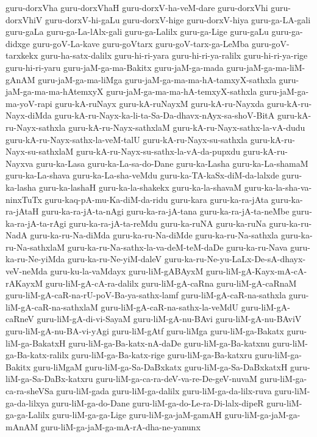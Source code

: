 {guru-dorxVha
guru-dorxVhaH
guru-dorxV-ha-veM-dare
guru-dorxVhi
guru-dorxVhiV
guru-dorxV-hi-gaLu
guru-dorxV-hige
guru-dorxV-hiya
guru-ga-LA-gali
guru-gaLa
guru-ga-La-lAlx-gali
guru-ga-Lalilx
guru-ga-Lige
guru-gaLu
guru-ga-didxge
guru-goV-La-kave
guru-goVtarx
guru-goV-tarx-ga-LeMba
guru-goV-tarxkekx
guru-ha-satx-dalilx
guru-hi-ri-yara
guru-hi-ri-ya-ralilx
guru-hi-ri-ya-rige
guru-hi-ri-yaru
guru-jaM-ga-ma-Bakitx
guru-jaM-ga-mada
guru-jaM-ga-ma-liM-gAnAM
guru-jaM-ga-ma-liMga
guru-jaM-ga-ma-ma-hA-tamxyX-sathxla
guru-jaM-ga-ma-ma-hAtemxyX
guru-jaM-ga-ma-ma-hA-temxyX-sathxla
guru-jaM-ga-ma-yoV-rapi
guru-kA-ruNayx
guru-kA-ruNayxM
guru-kA-ru-Nayxda
guru-kA-ru-Nayx-diMda
guru-kA-ru-Nayx-ka-li-ta-Sa-Da-dhavx-nAyx-sa-shoV-BitA
guru-kA-ru-Nayx-sathxla
guru-kA-ru-Nayx-sathxlaM
guru-kA-ru-Nayx-sathx-la-vA-dudu
guru-kA-ru-Nayx-sathx-la-veM-talU
guru-kA-ru-Nayx-su-sathxla
guru-kA-ru-Nayx-su-sathxlaM
guru-kA-ru-Nayx-su-sathx-la-vA-da-pupxdu
guru-kA-ru-Nayxva
guru-ka-Lasa
guru-ka-La-sa-do-Dane
guru-ka-Lasha
guru-ka-La-shamaM
guru-ka-La-shava
guru-ka-La-sha-veMdu
guru-ka-TA-kaSx-diM-da-lalxde
guru-ka-lasha
guru-ka-lashaH
guru-ka-la-shakekx
guru-ka-la-shavaM
guru-ka-la-sha-va-ninxTuTx
guru-kaq-pA-mu-Ka-diM-da-ridu
guru-kara
guru-ka-ra-jAta
guru-ka-ra-jAtaH
guru-ka-ra-jA-ta-nAgi
guru-ka-ra-jA-tana
guru-ka-ra-jA-ta-neMbe
guru-ka-ra-jA-ta-rAgi
guru-ka-ra-jA-ta-reMdu
guru-ka-ruNA
guru-ka-ruNa
guru-ka-ru-NadA
guru-ka-ru-Na-diMda
guru-ka-ru-Na-diMde
guru-ka-ru-Na-sathxla
guru-ka-ru-Na-sathxlaM
guru-ka-ru-Na-sathx-la-va-deM-teM-daDe
guru-ka-ru-Nava
guru-ka-ru-Ne-yiMda
guru-ka-ru-Ne-yiM-daleV
guru-ka-ru-Ne-yu-LaLx-De-sA-dhayx-veV-neMda
guru-ku-la-vaMdayx
guru-liM-gABAyxM
guru-liM-gA-Kayx-mA-cA-rAKayxM
guru-liM-gA-cA-ra-dalilx
guru-liM-gA-caRna
guru-liM-gA-caRnaM
guru-liM-gA-caR-na-rU-poV-Ba-ya-sathx-lamf
guru-liM-gA-caR-na-sathxla
guru-liM-gA-caR-na-sathxlaM
guru-liM-gA-caR-na-sathx-la-veMdU
guru-liM-gA-caRneV
guru-liM-gA-di-vi-SayaM
guru-liM-gA-nu-BAvi
guru-liM-gA-nu-BAviV
guru-liM-gA-nu-BA-vi-yAgi
guru-liM-gAtf
guru-liMga
guru-liM-ga-Bakatx
guru-liM-ga-BakatxH
guru-liM-ga-Ba-katx-nA-daDe
guru-liM-ga-Ba-katxnu
guru-liM-ga-Ba-katx-ralilx
guru-liM-ga-Ba-katx-rige
guru-liM-ga-Ba-katxru
guru-liM-ga-Bakitx
guru-liMgaM
guru-liM-ga-Sa-DaBxkatx
guru-liM-ga-Sa-DaBxkatxH
guru-liM-ga-Sa-DaBx-katxru
guru-liM-ga-ca-ra-deV-va-re-De-geV-nuvaM
guru-liM-ga-ca-ra-sheVSa
guru-liM-gada
guru-liM-ga-dalilx
guru-liM-ga-da-lilx-ruva
guru-liM-ga-da-lilxya
guru-liM-ga-do-Dane
guru-liM-ga-do-Le-ra-Di-lalx-dipeR
guru-liM-ga-ga-Lalilx
guru-liM-ga-ga-Lige
guru-liM-ga-jaM-gamAH
guru-liM-ga-jaM-ga-mAnAM
guru-liM-ga-jaM-ga-mA-rA-dha-ne-yanunx
}
